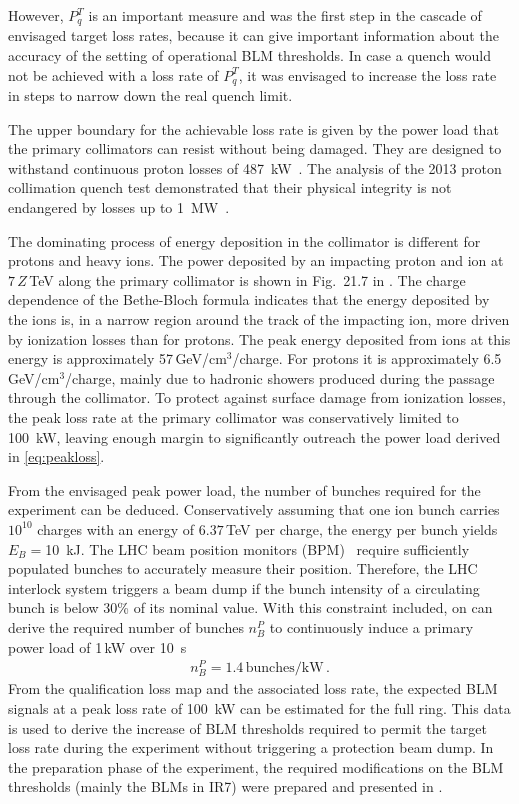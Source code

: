 However, $P_q^T$ is an important measure and was the first step in the cascade of envisaged target loss rates, because it can give important information about the accuracy of the setting of operational BLM thresholds. In case a quench would not be achieved with a loss rate of $P_q^T$,  it was envisaged to increase the loss rate in steps to narrow down the real quench limit. 

The upper boundary for the achievable loss rate is given by the power load that the primary collimators can resist without being damaged. They are designed to withstand continuous proton losses of 487~kW~\cite{EPAC02:TUAGB01}. The analysis of the 2013 proton collimation quench test demonstrated that their physical integrity is not endangered by losses up to 1~MW~\cite{IPAC14:MOPRO043}. 

The dominating process of energy deposition in the collimator is different for protons and heavy ions. The power deposited by an impacting proton and \lead ion at $7\,Z\,$TeV along the primary collimator is shown in Fig.~21.7 in \citedr. The charge dependence of the Bethe-Bloch formula indicates that the energy deposited by the \lead ions is, in a narrow region around the track of the impacting ion, more driven by ionization losses than for protons. The peak energy deposited from \lead ions at this energy is approximately 57\,GeV/cm$^3$/charge. For protons it is approximately 6.5\,GeV/cm$^3$/charge, mainly due to hadronic showers produced during the passage through the collimator. To protect against surface damage from ionization losses, the peak loss rate at the primary collimator was conservatively limited to 100~kW, leaving enough margin to significantly outreach the power load derived in \eqref{eq:peakloss}.

From the envisaged peak power load, the number of bunches required for the experiment can be deduced. Conservatively assuming that one ion bunch carries $10^{10}$ charges with an energy of $6.37\,$TeV per charge, the energy per bunch yields $E_B=$10~kJ. The LHC beam position monitors (BPM)~\cite{PAC99:THAR3} require sufficiently populated bunches to accurately measure their position. Therefore, the LHC interlock system triggers a beam dump if the bunch intensity of a circulating bunch is below 30\% of its nominal value. With this constraint included, on can derive the required number of bunches $n_B^P$ to continuously induce a primary power load of 1\,kW over 10~s
\begin{align}
 n_B^P=1.4 \,\text{bunches/kW} \,.
\end{align}
From the qualification loss map and the associated loss rate, the expected BLM signals at a peak loss rate of 100~kW can be estimated for the full ring. This data is used to derive the increase of BLM thresholds required to permit the target loss rate during the experiment without triggering a protection beam dump. In the preparation phase of the experiment, the required modifications on the BLM thresholds (mainly the BLMs in IR7) were prepared and presented in \cite{BLM-ECR-0043}. 





